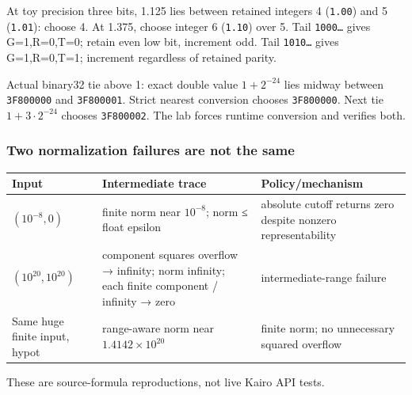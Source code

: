 At toy precision three bits, 1.125 lies between retained integers 4 (\texttt{1.00}) and 5 (\texttt{1.01}): choose 4. At 1.375, choose integer 6 (\texttt{1.10}) over 5. Tail \texttt{1000…} gives G=1,R=0,T=0; retain even low bit, increment odd. Tail \texttt{1010…} gives G=1,R=0,T=1; increment regardless of retained parity.

Actual binary32 tie above 1: exact double value \(1+2^{-24}\) lies midway between \texttt{3F800000} and \texttt{3F800001}. Strict nearest conversion chooses \texttt{3F800000}. Next tie \(1+3\cdot2^{-24}\) chooses \texttt{3F800002}. The lab forces runtime conversion and verifies both.

\subsubsection{Two normalization failures are not the same}\label{appendix-92ff77d4dfdc-two-normalization-failures-are-not-the-same}

{\def\LTcaptype{none} %
\begin{longtable}[]{@{}
  >{\raggedright\arraybackslash}p{}
  >{\raggedright\arraybackslash}p{}
  >{\raggedright\arraybackslash}p{}@{}}
\toprule\noalign{}
\begin{minipage}[b]{\linewidth}\raggedright
Input
\end{minipage} & \begin{minipage}[b]{\linewidth}\raggedright
Intermediate trace
\end{minipage} & \begin{minipage}[b]{\linewidth}\raggedright
Policy/mechanism
\end{minipage} \\
\midrule\noalign{}
\endhead
\bottomrule\noalign{}
\endlastfoot
\((10^{-8},0)\) & finite norm near \(10^{-8}\); norm ≤ float epsilon & absolute cutoff returns zero despite nonzero representability \\
\((10^{20},10^{20})\) & component squares overflow → infinity; norm infinity; each finite component / infinity → zero & intermediate-range failure \\
Same huge finite input, hypot & range-aware norm near \(1.4142\times10^{20}\) & finite norm; no unnecessary squared overflow \\
\end{longtable}
}

These are source-formula reproductions, not live Kairo API tests.

